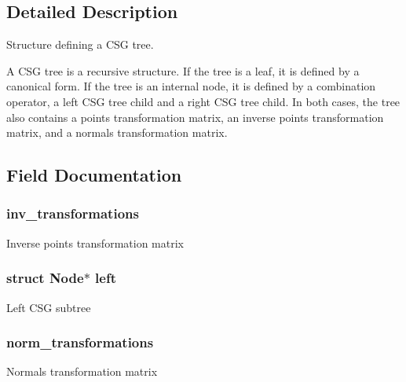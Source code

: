 \subsection{Detailed Description}
Structure defining a C\+SG tree. 

A C\+SG tree is a recursive structure. If the tree is a leaf, it is defined by a canonical form. If the tree is an internal node, it is defined by a combination operator, a left C\+SG tree child and a right C\+SG tree child. In both cases, the tree also contains a points transformation matrix, an inverse points transformation matrix, and a normals transformation matrix. 

\subsection{Field Documentation}
\subsubsection[{\texorpdfstring{inv\+\_\+transformations}{inv_transformations}}]{ inv\+\_\+transformations}\hypertarget{struct_node_a4b726ee7ba7e35b04356dae649a0f39e}{}\label{struct_node_a4b726ee7ba7e35b04356dae649a0f39e}
Inverse points transformation matrix 
\subsubsection[{\texorpdfstring{left}{left}}]{\setlength{\rightskip}{0pt plus 5cm}struct {\bf Node}$\ast$ left}\hypertarget{struct_node_a25eed0b3ce3478a3edb4a00c81dedd5e}{}\label{struct_node_a25eed0b3ce3478a3edb4a00c81dedd5e}
Left C\+SG subtree 
\subsubsection[{\texorpdfstring{norm\+\_\+transformations}{norm_transformations}}]{ norm\+\_\+transformations}\hypertarget{struct_node_a902250dd3f3a7dc23af98f9a7df93317}{}\label{struct_node_a902250dd3f3a7dc23af98f9a7df93317}
Normals transformation matrix 
